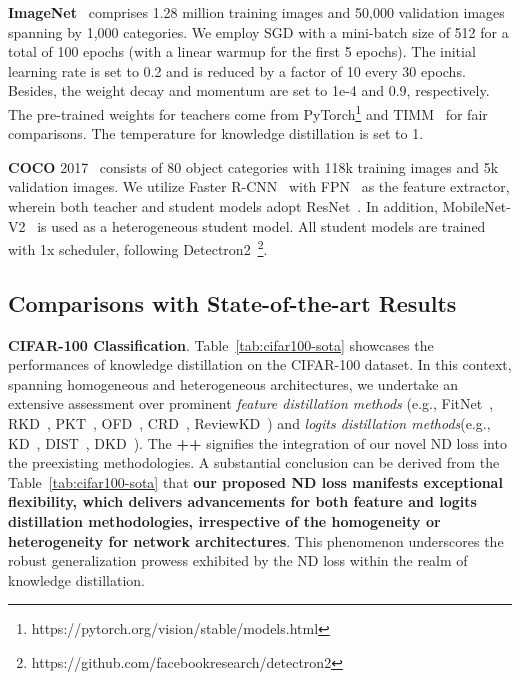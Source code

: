 \documentclass{article}
\begin{document}
\textbf{ImageNet}~\cite{russakovsky2015imagenet} comprises 1.28 million training images and 50,000 validation images spanning by 1,000 categories. We employ SGD with a mini-batch size of 512 for a total of 100 epochs (with a linear warmup for the first 5 epochs). The initial learning rate is set to 0.2 and is reduced by a factor of 10 every 30 epochs. Besides, the weight decay and momentum are set to 1e-4 and 0.9, respectively. The pre-trained weights for teachers come from PyTorch\footnote{https://pytorch.org/vision/stable/models.html} and TIMM~\cite{rw2019timm} for fair comparisons. The temperature for knowledge distillation is set to 1.


\textbf{COCO} 2017~\cite{lin2014microsoft} consists of 80 object categories with 118k training images and 5k validation images. We utilize Faster R-CNN~\cite{ren2015faster} with FPN~\cite{lin2017feature} as the feature extractor, wherein both teacher and student models adopt ResNet~\cite{he2016deep}. In addition, MobileNet-V2~\cite{sandler2018mobilenetv2} is used as a heterogeneous student model. All student models are trained with 1x scheduler, following Detectron2~\footnote{https://github.com/facebookresearch/detectron2}.



\subsection{Comparisons with State-of-the-art Results}\label{sec:sota}
\textbf{CIFAR-100 Classification}. Table~\ref{tab:cifar100-sota} showcases the performances of knowledge distillation on the CIFAR-100 dataset. In this context, spanning homogeneous and heterogeneous architectures, we undertake an extensive assessment over prominent \textit{feature distillation methods} (e.g., FitNet~\cite{romero2014fitnets}, RKD~\cite{park2019relational}, PKT~\cite{passalis2018probabilistic}, OFD~\cite{heo2019comprehensive}, CRD~\cite{tian2019contrastive}, ReviewKD~\cite{chen2021distilling}) and \textit{logits distillation methods}(e.g., KD~\cite{hinton2015distilling}, DIST~\cite{huang2022knowledge}, DKD~\cite{zhao2022decoupled}). The \textbf{++} signifies the integration of our novel ND loss into the preexisting methodologies.
A substantial conclusion can be derived from the Table~\ref{tab:cifar100-sota} that \textbf{our proposed ND loss manifests exceptional flexibility, which delivers advancements for both feature and logits distillation methodologies, irrespective of the homogeneity or heterogeneity for network architectures}. This phenomenon underscores the robust generalization prowess exhibited by the ND loss within the realm of knowledge distillation.
\end{document}
